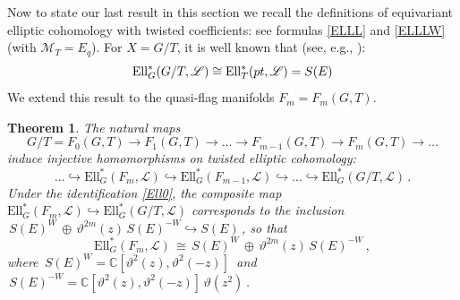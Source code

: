 \documentclass[11pt]{amsart}
\newtheorem{theorem}{Theorem}[section]
\theoremstyle{definition}
\theoremstyle{remark}
\numberwithin{equation}{section}
\newcommand{\la}{\label}
\newcommand{\into}{\hookrightarrow}
\def\c{\mathbb{C}}
\def\M{\mathcal{M}}
\def\cL{\mathscr{
L}}
\def\ELL{\mathrm{Ell}}
\begin{document}
Now to state our last result in this section we recall the definitions  of equivariant
elliptic cohomology with twisted coefficients: see formulas \eqref{ELLL} and \eqref{ELLLW} (with $ \M_T = E_q$). 
For $ X = G/T $, it is well known that  (see, e.g., \cite{Ga14}):
%
\begin{equation}
\la{Ell0}
\ELL_G^*(G/T, {\mathscr L}) \cong \ELL_T^*({\rm pt}, \cL) = S(E)
\end{equation}
%
We extend this result to the quasi-flag manifolds $ F_m = F_m(G,T) $.
%
\begin{theorem}
\la{EllTw}
The natural maps 
%
$$
G/T = F_0(G,T) \to F_1(G,T) \to \ldots \to F_{m-1}(G,T) \to F_m(G,T) \to \ldots
$$
%
induce injective homomorphisms on twisted elliptic cohomology:
$$
\ldots \into \ELL_G^*(F_m, {\mathscr L}) \into \ELL_G^*(F_{m-1}, {\mathscr L}) \into \ldots \into
\ELL_G^*(G/T, \cL)\,.
$$
%
Under the identification \eqref{Ell0}, the composite map $\ELL_G^*(F_m, {\mathscr L})\into \ELL_G^*(G/T, \cL)$ corresponds to the inclusion $\,S(E)^W \,\oplus \, \vartheta^{2m}(z)\,S(E)^{-W} \into S(E) \,$, so that
%
\begin{equation}
\la{ELLG}
\ELL_G^*(F_m, {\mathscr L}) \,\cong\, 
S(E)^W \,\oplus \, \vartheta^{2m}(z)\,S(E)^{-W}\,,
\end{equation}
%
where $ \,S(E)^W = \c[\vartheta^2(z), \vartheta^2(-z)] \,$ and $\, S(E)^{-W} = \c[\vartheta^2(z), \vartheta^2(-z)]\,\vartheta(z^2)\,$.
\end{theorem}
%
\end{document}
